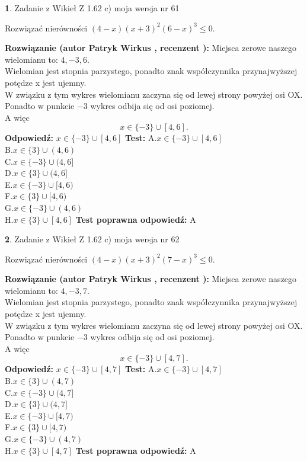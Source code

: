 \documentclass[12pt, a4paper]{article}
\theoremstyle{definition} %
\newtheorem{zad}{}
\newcommand{\zadStart}[1]{\begin{zad}#1\newline}
\newcommand{\zadStop}{\end{zad}}
\newcommand{\rozwStart}[2]{\noindent \textbf{Rozwiązanie (autor #1 , recenzent #2): }\newline}
\newcommand{\rozwStop}{\newline}
\newcommand{\odpStart}{\noindent \textbf{Odpowiedź:}\newline}
\newcommand{\odpStop}{\newline}
\newcommand{\testStart}{\noindent \textbf{Test:}\newline}
\newcommand{\testStop}{\newline}
\newcommand{\kluczStart}{\noindent \textbf{Test poprawna odpowiedź:}\newline}
\newcommand{\kluczStop}{\newline}
\begin{document}
\zadStart{Zadanie z Wikieł Z 1.62 c) moja wersja nr 61}

Rozwiązać nierówności $(4-x)(x+3)^{2}(6-x)^{3}\le0$.
\zadStop
\rozwStart{Patryk Wirkus}{}
Miejsca zerowe naszego wielomianu to: $4, -3, 6$.\\
Wielomian jest stopnia parzystego, ponadto znak współczynnika przy\linebreak najwyższej potędze x jest ujemny.\\ W związku z tym wykres wielomianu zaczyna się od lewej strony powyżej osi OX.\\
Ponadto w punkcie $-3$ wykres odbija się od osi poziomej.\\
A więc $$x \in \{-3\} \cup [4,6].$$
\rozwStop
\odpStart
$x \in \{-3\} \cup [4,6]$
\odpStop
\testStart
A.$x \in \{-3\} \cup [4,6]$\\
B.$x \in \{3\} \cup (4,6)$\\
C.$x \in \{-3\} \cup (4,6]$\\
D.$x \in \{3\} \cup (4,6]$\\
E.$x \in \{-3\} \cup [4,6)$\\
F.$x \in \{3\} \cup [4,6)$\\
G.$x \in \{-3\} \cup (4,6)$\\
H.$x \in \{3\} \cup [4,6]$
\testStop
\kluczStart
A
\kluczStop



\zadStart{Zadanie z Wikieł Z 1.62 c) moja wersja nr 62}

Rozwiązać nierówności $(4-x)(x+3)^{2}(7-x)^{3}\le0$.
\zadStop
\rozwStart{Patryk Wirkus}{}
Miejsca zerowe naszego wielomianu to: $4, -3, 7$.\\
Wielomian jest stopnia parzystego, ponadto znak współczynnika przy\linebreak najwyższej potędze x jest ujemny.\\ W związku z tym wykres wielomianu zaczyna się od lewej strony powyżej osi OX.\\
Ponadto w punkcie $-3$ wykres odbija się od osi poziomej.\\
A więc $$x \in \{-3\} \cup [4,7].$$
\rozwStop
\odpStart
$x \in \{-3\} \cup [4,7]$
\odpStop
\testStart
A.$x \in \{-3\} \cup [4,7]$\\
B.$x \in \{3\} \cup (4,7)$\\
C.$x \in \{-3\} \cup (4,7]$\\
D.$x \in \{3\} \cup (4,7]$\\
E.$x \in \{-3\} \cup [4,7)$\\
F.$x \in \{3\} \cup [4,7)$\\
G.$x \in \{-3\} \cup (4,7)$\\
H.$x \in \{3\} \cup [4,7]$
\testStop
\kluczStart
A
\kluczStop
\end{document}
